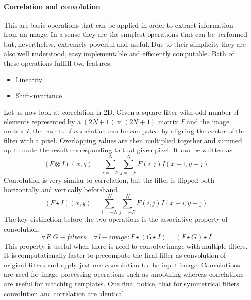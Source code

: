 \paragraph{Correlation and convolution}\cite{correlation-convolution}
This are basic operations that can be applied in order to extract information from an image. In a sense they are the simplest operations that can be performed but, nevertheless, extremely powerful and useful. Due to their simplicity they are also well understood, easy implementable and efficiently computable. Both of these operations fullfill two features:
\begin{itemize}
	\item Linearity
	\item Shift-invariance
\end{itemize}
Let us now look at correlation in 2D. Given a square filter with odd number of elements represented by a $(2N + 1)$ x $(2N + 1)$ matrix $F$ and the image matrix $I$, the results of correlation can be computed by aligning the center of the filter with a pixel. Overlapping values are then multiplied together and summed up to make the result corresponding to that given pixel. It can be written as
\begin{equation}
	(F \otimes I)(x, y) = \sum_{i = -N}^{N}\sum_{j = -N}^{N}F(i, j)I(x + i, y + j)
\end{equation}
Convolution is very similar to correlation, but the filter is flipped both horizontally and vertically beforehand. 
\begin{equation}
	(F \star I)(x, y) = \sum_{i = -N}^{N}\sum_{j = -N}^{N}F(i, j)I(x - i, y - j)
\end{equation}
The key distinction before the two operations is the associative property of convolution:
\begin{equation}
	\forall F, G - filters \quad \forall I - image: F \star (G \star I) = (F \star G) \star I
\end{equation}
This property is useful when there is need to convolve image with multiple filters. It is computationally faster to precompute the final filter as convolution of original filters and apply just one convolution to the input image. Convolutions are used for image processing operations such as smoothing whereas correlations are useful for matching templates.
One final notice, that for symmetrical filters convolution and correlation are identical.


